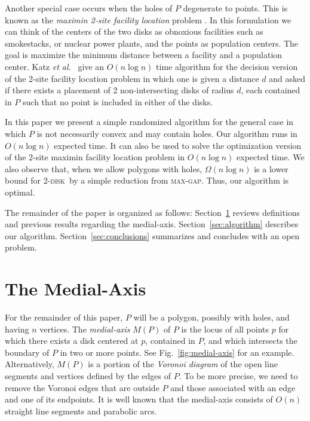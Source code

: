 \documentclass[twoside]{report}
\newcommand{\etal}{\emph{et al.}}
\newcommand{\seclabel}[1]{\label{sec:#1}}
\newcommand{\secref}[1]{\mbox{Section~\ref{sec:#1}}}
\newcommand{\figref}[1]{\mbox{Fig.~\ref{fig:#1}}}
\newcommand{\tdisk}{\textsc{2-disk}}
\begin{document}
\begin{paper}
Another special case occurs when the holes of $P$ degenerate to points.  This
is known as the \emph{maximin 2-site facility location} problem
\cite{bks00,kks02}.  In this formulation we can think of the centers of the two
disks as obnoxious facilities such as smokestacks, or nuclear power plants, and
the points as population centers.  The goal is maximize the minimum distance
between a facility and a population center.  Katz \etal\ \cite{kks02} give an
$O(n\log n)$ time algorithm for the decision version of the 2-site facility
location problem in which one is given a distance $d$ and asked if there exists
a placement of 2 non-intersecting disks of radius $d$, each contained in $P$
such that no point is included in either of the disks.

In this paper we present a simple randomized algorithm for the general
case in which $P$ is not necessarily convex and may contain holes.
Our algorithm runs in $O(n\log n)$ expected time.  It can also be used
to solve the optimization version of the 2-site maximin facility
location problem in $O(n\log n)$ expected time. We also observe that, when we
allow polygons with holes, $\Omega(n\log n)$ is a lower bound for
\tdisk\ by a simple reduction from \textsc{max-gap}.  Thus, our
algorithm is optimal.

The remainder of the paper is organized as follows:
\secref{medial-axis} reviews definitions and previous results
regarding the medial-axis. \secref{algorithm} describes our
algorithm. \secref{conclusions} summarizes and concludes with an open
problem.

\section{The Medial-Axis}\seclabel{medial-axis}

For the remainder of this paper, $P$ will be a polygon,
possibly with holes, and having $n$ vertices.  The \emph{medial-axis}
$M(P)$ of $P$ is the locus of all points $p$ for which there exists a
disk centered at $p$, contained in $P$, and which intersects the
boundary of $P$ in two or more points. See \figref{medial-axis} for an
example.  Alternatively, $M(P)$ is a portion of the \emph{Voronoi
diagram} of the open line segments and vertices defined by the 
edges of $P$. To be more precise, 
we need to remove the Voronoi edges that are outside $P$ and those
associated with an edge and one of its endpoints. 
It is well known that the medial-axis consists of
$O(n)$ straight line segments and parabolic arcs.


\end{paper}
\end{document}
